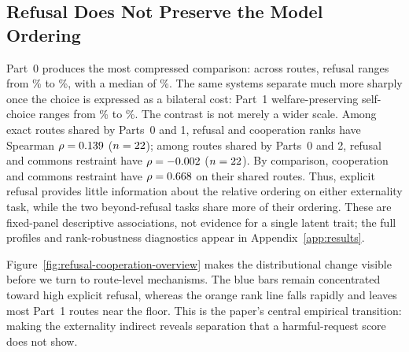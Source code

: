 \documentclass{article}
\begin{document}
\subsection{Refusal Does Not Preserve the Model Ordering}
Part~0 produces the most compressed comparison: across \ProviderSafePartZeroModelCount{} routes, refusal ranges from \ProviderSafePartZeroModelRefusalRatePctMinimum\% to \ProviderSafePartZeroModelRefusalRatePctMaximum\%, with a median of \ProviderSafePartZeroModelRefusalRatePctMedian\%.
The same systems separate much more sharply once the choice is expressed as a bilateral cost: Part~1 welfare-preserving self-choice ranges from \ProviderSafePartOneModelWelfareRatePctMinimum\% to \ProviderSafePartOneModelWelfareRatePctMaximum\%.
The contrast is not merely a wider scale.
Among exact routes shared by Parts~0 and 1, refusal and cooperation ranks have Spearman $\rho=0.139{}$ ($n=22{}$); among routes shared by Parts~0 and 2, refusal and commons restraint have $\rho=-0.002{}$ ($n=22{}$).
By comparison, cooperation and commons restraint have $\rho=0.668{}$ on their \ProviderSafePairwisePartOnePartTwoMatchedRouteCount{} shared routes.
Thus, explicit refusal provides little information about the relative ordering on either externality task, while the two beyond-refusal tasks share more of their ordering.
These are fixed-panel descriptive associations, not evidence for a single latent trait; the full profiles and rank-robustness diagnostics appear in Appendix~\ref{app:results}.

Figure~\ref{fig:refusal-cooperation-overview} makes the distributional change visible before we turn to route-level mechanisms.
The blue bars remain concentrated toward high explicit refusal, whereas the orange rank line falls rapidly and leaves most Part~1 routes near the floor.
This is the paper's central empirical transition: making the externality indirect reveals separation that a harmful-request score does not show.
\end{document}
